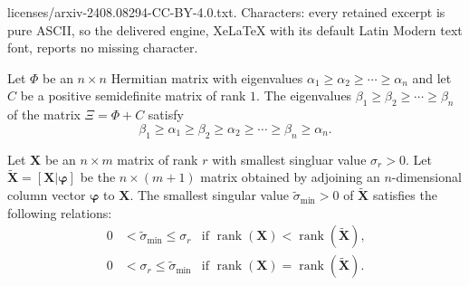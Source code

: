 \documentclass[10pt,a4paper]{amsart}
\DeclareMathOperator{\rank}{rank}
\newcommand{\bbX}{\mathbf{X}}
\newcommand{\bphi}{\boldsymbol{\varphi}}
\begin{document}
licenses/arxiv-2408.08294-CC-BY-4.0.txt. Characters: every retained excerpt is pure ASCII, so the delivered engine, XeLaTeX with its default Latin Modern text font, reports no missing character.
\begin{theorem}\label{thm:interlaced-eigenvalues}
Let $\Phi$ be an $n\times n$ Hermitian matrix with eigenvalues $\alpha_1\ge \alpha_2 \ge \cdots \ge \alpha_n$ and let $C$ be a positive semidefinite matrix of rank $1$.  The eigenvalues  $\beta_1\ge \beta_2 \ge \cdots \ge \beta_n$ of the matrix $\Xi = \Phi + C$ satisfy 
\[
\beta_1 \ge \alpha_1 \ge \beta_2 \ge \alpha_2 \ge \cdots \ge \beta_n \ge \alpha_n.
\]
\end{theorem}

\begin{theorem}\label{thm:add-column-inverse-norm}
Let $\bbX$ be an $n\times m$ matrix of rank $r$ with smallest  singluar value $\sigma_r>0$.  Let $\widetilde{\bbX} = [\bbX | \bphi]$ be the $n\times (m+1)$ matrix obtained by adjoining an $n$-dimensional column vector $\bphi$ to $\bbX$.  The smallest singular value $\widetilde{\sigma}_{\mathrm{min}}>0$ of $\widetilde{\bbX}$ satisfies the following relations:
\begin{align*}
0 & < \widetilde{\sigma}_{\mathrm{min}} \le \sigma_r  & 
\text{if $\rank(\bbX) < \rank(\widetilde{\bbX})$,}\\
0 & < {\sigma}_r \le \widetilde{\sigma}_{\mathrm{min}}  & \text{if $\rank(\bbX) = \rank(\widetilde{\bbX})$.}
\end{align*}
\end{theorem}
\end{document}
